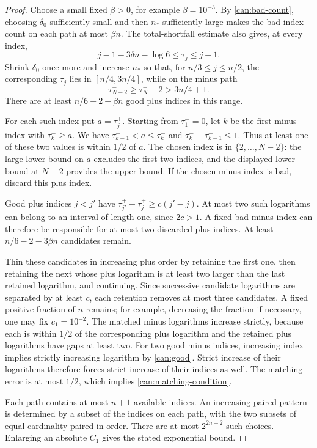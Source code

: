 \begin{proof}
Choose a small fixed $\beta>0$, for example $\beta=10^{-3}$.  By
\cref{can:bad-count}, choosing $\delta_0$ sufficiently small and then
$n_*$ sufficiently large makes the bad-index count on each path at most
$\beta n$.  The total-shortfall estimate also gives, at every index,
\[
j-1-3\delta n-\log6\le\tau_j\le j-1.
\]
Shrink $\delta_0$ once more and increase $n_*$ so that, for
$n/3\le j\le n/2$, the corresponding $\tau_j$ lies in
$[n/4,3n/4]$, while on the minus path
\[
\tau_{N-2}^-\ge\tau_N^--2>3n/4+1.
\]
There are at least $n/6-2-\beta n$ good plus indices in this range.

For each such index put $a=\tau_j^+$.  Starting from $\tau_1^-=0$,
let $k$ be the first minus index with $\tau_k^-\ge a$.  We have
$\tau_{k-1}^-<a\le\tau_k^-$ and
$\tau_k^--\tau_{k-1}^-\le1$.  Thus at least one of these two values
is within $1/2$ of $a$.  The chosen index is in
$\{2,\ldots,N-2\}$: the large lower bound on $a$ excludes the first
two indices, and the displayed lower bound at $N-2$ provides the upper
bound.  If the chosen minus index is bad, discard this plus index.

Good plus indices $j<j'$ have
$\tau_{j'}^+-\tau_j^+\ge c(j'-j)$.  At most two such logarithms can
belong to an interval of length one, since $2c>1$.  A fixed bad minus
index can therefore be responsible for at most two discarded plus
indices.  At least $n/6-2-3\beta n$ candidates remain.

Thin these candidates in increasing plus order by retaining the first
one, then retaining the next whose plus logarithm is at least two larger
than the last retained logarithm, and continuing.  Since successive
candidate logarithms are separated by at least $c$, each retention
removes at most three candidates.  A fixed positive fraction of $n$
remains; for example, decreasing the fraction if necessary, one may fix
$c_1=10^{-2}$.  The matched minus logarithms increase strictly, because
each is within $1/2$ of the corresponding plus logarithm and the retained
plus logarithms have gaps at least two.  For two good minus indices,
increasing index implies strictly increasing logarithm by
\cref{can:good}.  Strict increase of their logarithms therefore forces
strict increase of their indices as well.  The matching error is at most
$1/2$, which implies \cref{can:matching-condition}.

Each path contains at most $n+1$ available indices.  An increasing paired
pattern is determined by a subset of the indices on each path, with the
two subsets of equal cardinality paired in order.  There are at most
$2^{2n+2}$ such choices.  Enlarging an absolute $C_1$ gives the stated
exponential bound.
\end{proof}

